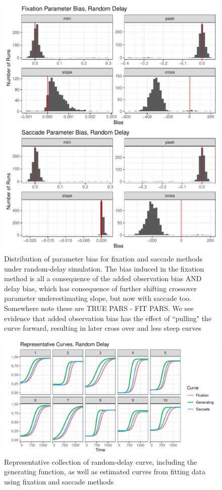 \documentclass{article}
\begin{document}
\begin{figure}[H]
\centering
\includegraphics{random_delay_par_bias.pdf}
\caption{Distribution of parameter bias for fixation and saccade methods under random-delay simulation. The bias induced in the fixation method is all a consequence of the added observation bias AND delay bias, which has consequence of further shifting crossover parameter underestimating slope, but now with saccade too. Somewhere note these are TRUE PARS - FIT PARS. We see evidence that added observation bias has the effect of ``pulling" the curve forward, resulting in later cross over and less steep curves}
\label{fig:random_par_bias}
\end{figure}


\begin{figure}[H]
\centering
\includegraphics{random_pb_curves.pdf}
\caption{Representative collection of random-delay curve, including  the generating function, as well as estimated curves from fitting data using fixation and saccade methods}
\label{fig:random_pb_curves}
\end{figure}
\end{document}
